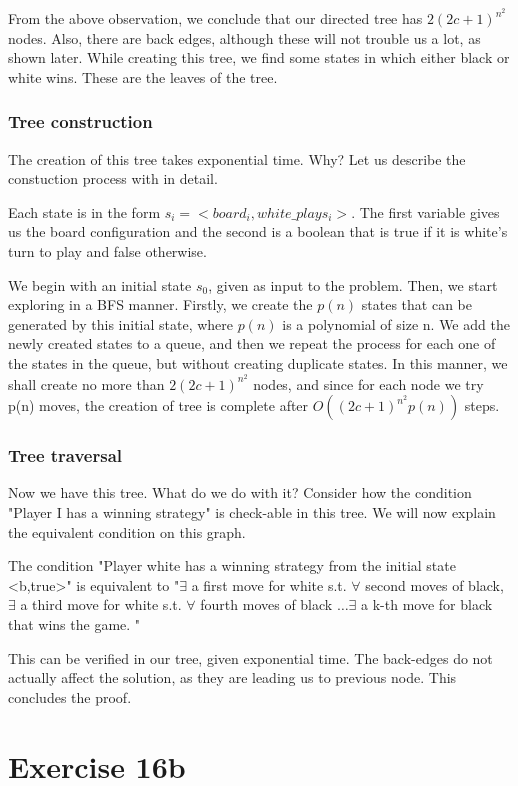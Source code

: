 From the above observation, we conclude that our directed tree has $2(2c+1)^{n^2}$ nodes. Also, there are back edges, although these will not trouble us a lot, as shown later. While 
creating this tree, we find some states in which either black or white 
wins. These are the leaves of the tree. 

\subsubsection*{Tree construction}
The creation of this tree takes exponential time. Why? Let us describe the 
constuction process with in detail.

Each state is in the form $s_i= <board_i, white\_plays_i>$. The first variable gives us the board configuration and 
the second is a boolean that is true if it is white's turn to play and false otherwise. 

We begin with an initial state $s_0$, given as input to the problem. Then, we start exploring in a BFS manner. Firstly, we 
create the $p(n)$ states that can be generated by this initial state, where $p(n)$ is a polynomial of size n. We add the newly
created states to a queue, and then we repeat the process for each one of the states in the queue, but without creating 
duplicate states. In this manner, we shall create no more than $2(2c+1)^{n^2}$ nodes, and since for each node we 
try p(n) moves, the creation of tree is complete after $O((2c+1)^{n^2}p(n))$ steps.

\subsubsection*{Tree traversal}
Now we have this tree. What do we do with it? Consider how the condition
"Player I has a winning strategy" is check-able in this tree. We will now 
explain the equivalent condition on this graph. 

The condition "Player white has a winning strategy from the initial state 
<b,true>" is equivalent to "$\exists$ a first move for white s.t. $\forall$ second moves 
of black, $\exists$ a third move for white s.t. $\forall$ fourth moves of black
$\ldots \exists$ a k-th move for black that wins the game. "

This can be verified in our tree, given exponential time. The back-edges 
do not actually affect the solution, as they are leading us to previous node.
This concludes the proof.

\section*{Exercise 16b}

